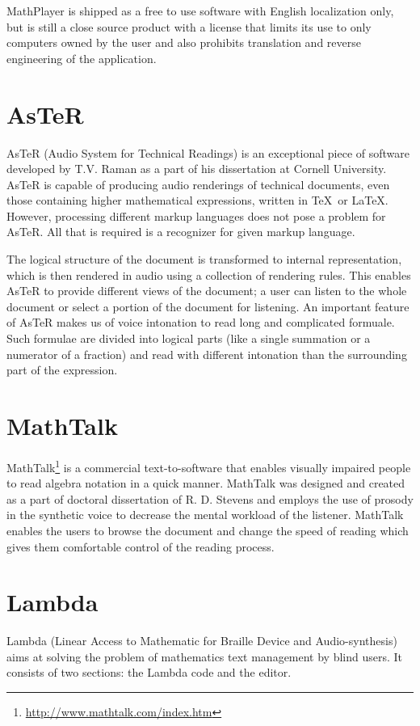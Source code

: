 \documentclass[11pt,oneside,final]{fithesis2}
\begin{document}
MathPlayer is shipped as a free to use software with English localization only, but is still a close source product with a license that limits its use to only computers owned by the user and also prohibits translation and reverse engineering of the application.

\section{AsTeR}
AsTeR (Audio System for Technical Readings)\cite{aster1994} is an exceptional piece of software developed by T.V. Raman as a part of his dissertation at Cornell University. AsTeR is capable of producing audio renderings of technical documents, even those containing higher mathematical expressions, written in \TeX\ or \LaTeX. However, processing different markup languages does not pose a problem for AsTeR. All that is required is a recognizer for given markup language. 

The logical structure of the document is transformed to internal representation, which is then rendered in audio using a collection of rendering rules. This enables AsTeR to provide different views of the document; a user can listen to the whole document or select a portion of the document for listening. An important feature of AsTeR makes us of voice intonation to read long and complicated formuale. Such formulae are divided into logical parts (like a single summation or a numerator of a fraction) and read with different intonation than the surrounding part of the expression. 

\section{MathTalk}
MathTalk\footnote{\url{http://www.mathtalk.com/index.htm}}\cite{mathtalk:stevens1994mathtalk} is a commercial text-to-software that enables visually impaired people to read algebra notation in a quick manner. MathTalk was designed and created as a part of doctoral dissertation of R. D. Stevens\cite{mathtalk:stevens1996principles} and employs the use of prosody in the synthetic voice to decrease the mental workload of the listener. MathTalk enables the users to browse the document and change the speed of reading which gives them comfortable control of the reading process.

\section{Lambda}
Lambda\cite{lambda:schweikhardt2006lambda} (Linear Access to Mathematic for Braille Device and Audio-synthesis) aims at solving the problem of mathematics text management by blind users. It consists of two sections: the Lambda code and the editor.
\end{document}
